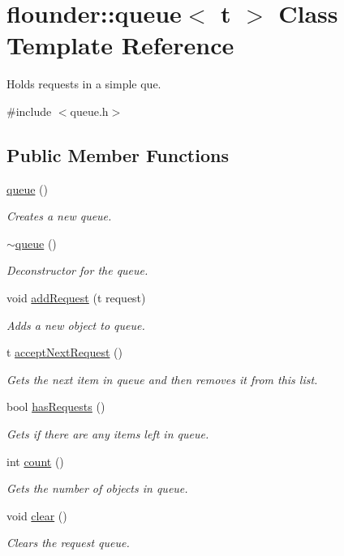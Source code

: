 \hypertarget{classflounder_1_1queue}{}\section{flounder\+:\+:queue$<$ t $>$ Class Template Reference}
\label{classflounder_1_1queue}


Holds requests in a simple que.  




{\ttfamily \#include $<$queue.\+h$>$}

\subsection*{Public Member Functions}
\begin{DoxyCompactItemize}
\item 
\hyperlink{classflounder_1_1queue_a1ed42b04591cfd38e598b19acdae2251}{queue} ()
\begin{DoxyCompactList}\small\item\em Creates a new queue. \end{DoxyCompactList}\item 
\hyperlink{classflounder_1_1queue_a924c72fe34b398ea2dc055402b8c4e4a}{$\sim$queue} ()
\begin{DoxyCompactList}\small\item\em Deconstructor for the queue. \end{DoxyCompactList}\item 
void \hyperlink{classflounder_1_1queue_aa2f18bafcb4007630ca63b347b478a66}{add\+Request} (t request)
\begin{DoxyCompactList}\small\item\em Adds a new object to queue. \end{DoxyCompactList}\item 
t \hyperlink{classflounder_1_1queue_a67b97eab69c4ac95fe31d948a569ccce}{accept\+Next\+Request} ()
\begin{DoxyCompactList}\small\item\em Gets the next item in queue and then removes it from this list. \end{DoxyCompactList}\item 
bool \hyperlink{classflounder_1_1queue_adab970a13d2ff675a64848c99d2ba12a}{has\+Requests} ()
\begin{DoxyCompactList}\small\item\em Gets if there are any items left in queue. \end{DoxyCompactList}\item 
int \hyperlink{classflounder_1_1queue_aa424879808961c595a64397dc9097f4e}{count} ()
\begin{DoxyCompactList}\small\item\em Gets the number of objects in queue. \end{DoxyCompactList}\item 
void \hyperlink{classflounder_1_1queue_a6d104250ee0f4cab52dafc908fb926f2}{clear} ()
\begin{DoxyCompactList}\small\item\em Clears the request queue. \end{DoxyCompactList}\end{DoxyCompactItemize}
